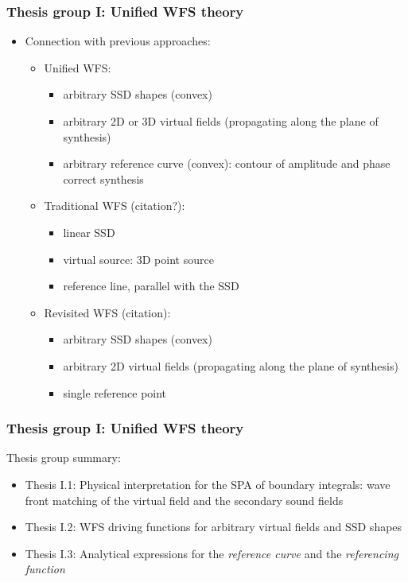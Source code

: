 \documentclass{beamer}
\begin{document}
\begin{frame}
\frametitle{Thesis group I: Unified WFS theory}
\begin{itemize}
\item Connection with previous approaches:
	\vspace{3mm}
\begin{itemize}
\item Unified WFS:
	\begin{itemize}
	\item arbitrary SSD shapes (convex)
	\item arbitrary 2D or 3D virtual fields (propagating along the plane of synthesis)
	\item arbitrary reference curve (convex): contour of amplitude and phase correct synthesis
	\end{itemize}
	\vspace{3mm}
\item Traditional WFS (citation?): 
	\begin{itemize}
	\item linear SSD
	\item virtual source: 3D point source
	\item reference line, parallel with the SSD
	\end{itemize}	
	\vspace{3mm}
\item Revisited WFS (citation): 
	\begin{itemize}
	\item arbitrary SSD shapes (convex)
	\item arbitrary 2D virtual fields (propagating along the plane of synthesis)
	\item single reference point
	\end{itemize}
\end{itemize}
\end{itemize}
\end{frame}

\begin{frame}
\frametitle{Thesis group I: Unified WFS theory}
Thesis group summary:
	\vspace{3mm}
	\begin{itemize}
	\item Thesis I.1: Physical interpretation for the SPA of boundary integrals: wave front matching of the virtual field and the secondary sound fields
	\vspace{3mm}
	\item Thesis I.2: WFS driving functions for arbitrary virtual fields and SSD shapes
	\vspace{3mm}
	\item Thesis I.3: Analytical expressions for the \emph{reference curve} and the \emph{referencing function}
	\end{itemize}
\end{frame}
\end{document}
